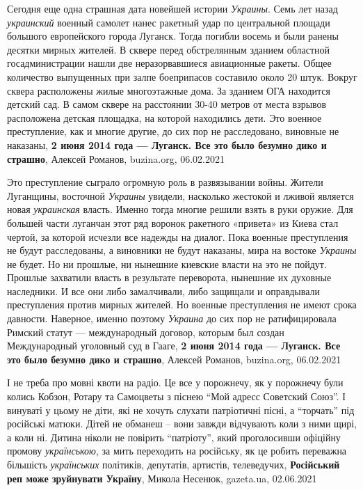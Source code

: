 Сегодня еще одна страшная дата новейшей истории \emph{Украины}. Семь лет назад
\emph{украинский} военный самолет нанес ракетный удар по центральной площади
большого европейского города Луганск. Тогда погибли восемь и были ранены
десятки мирных жителей.  В сквере перед обстрелянным зданием областной
госадминистрации нашли две неразорвавшиеся авиационные ракеты. Общее количество
выпущенных при залпе боеприпасов составило около 20 штук.  Вокруг сквера
расположены жилые многоэтажные дома. За зданием ОГА находится детский сад. В
самом сквере на расстоянии 30-40 метров от места взрывов расположена детская
площадка, на которой находились дети.  Это военное преступление, как и многие
другие, до сих пор не расследовано, виновные не наказаны,
\textbf{2 июня 2014 года — Луганск. Все это было безумно дико и страшно},
Алексей Романов, buzina.org, 06.02.2021

Это преступление сыграло огромную роль в развязывании войны. Жители Луганщины,
восточной \emph{Украины} увидели, насколько жестокой и лживой является новая
\emph{украинская} власть.  Именно тогда многие решили взять в руки оружие.  Для
большей части луганчан этот ряд воронок ракетного «привета» из Киева стал
чертой, за которой исчезли все надежды на диалог.  Пока военные преступления не
будут расследованы, а виновники не будут наказаны, мира на востоке \emph{Украины} не
будет.  Но ни прошлые, ни нынешние киевские власти на это не пойдут. Прошлые
захватили власть в результате переворота, нынешние их духовные наследники. И
все они либо замалчивали, либо защищали и оправдывали преступления против
мирных жителей.  Но военные преступления не имеют срока давности.  Наверное,
именно поэтому \emph{Украина} до сих пор не ратифицировала Римский статут —
международный договор, которым был создан Международный уголовный суд в Гааге,
\textbf{2 июня 2014 года — Луганск. Все это было безумно дико и страшно},
Алексей Романов, buzina.org, 06.02.2021

І не треба про мовні квоти на радіо. Це все у порожнечу, як у порожнечу були
колись Кобзон, Ротару та Самоцветы з піснею \enquote{Мой адресс Советский Союз}. І
винуваті у цьому не діти, які не хочуть слухати патріотичні пісні, а \enquote{торчать}
під російські матюки. Дітей не обманеш – вони завжди відчувають коли з ними
щирі, а коли ні. Дитина ніколи не повірить \enquote{патріоту}, який проголосивши
офіційну промову \emph{українською}, за мить переходить на російську, як це робить
переважна більшість \emph{українських} політиків, депутатів, артистів, телеведучих,
\textbf{Російський реп може зруйнувати Україну},
Микола Несенюк, gazeta.ua, 02.06.2021

